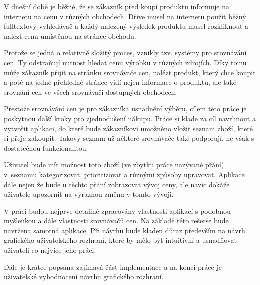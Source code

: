 \begin{introduction}
V dnešní době je běžné, že se zákazník před koupí produktu informuje na internetu na cenu v různých obchodech. Dříve musel na internetu použít běžný fulltextový vyhledávač a každý nalezený výsledek produktu musel rozkliknout a nalézt cenu umístěnou na stránce obchodu.

Protože se jedná o relativně složitý proces, vznikly tzv. systémy pro srovnávání cen. Ty odstraňují nutnost hledat cenu výrobku v různých zdrojích. Díky tomu může zákazník přijít na stránku srovnávače cen, nalézt produkt, který chce koupit a poté na jedné přehledné stránce vidí nejen informace o produktu, ale také srovnání cen ve všech srovnávači dostupných obchodech.

Přestože srovnávání cen je pro zákazníka usnadnění výběru, cílem této práce je poskytnou další kroky pro zjednodušení nákupu. Práce si klade za cíl navrhnout a vytvořit aplikaci, do které bude zákazníkovi umožněno vložit seznam zboží, které si přeje zakoupit. Takový seznam už některé srovnávače také podporují, ne však s dostatečnou funkcionalitou.

Uživatel bude mít možnost toto zboží (ve zbytku práce nazývané přání) v~seznamu kategorizovat, prioritizovat a různými způsoby upravovat. Aplikace dále nejen že bude u těchto přání zobrazovat vývoj ceny, ale navíc dokáže uživatele upozornit na výraznou změnu v tomto vývoji.

V práci budou nejprve detailně zpracovány vlastnosti aplikací s podobnou myšlenkou a dále vlastnosti srovnávačů cen. Na základě této rešerše bude navržena samotná aplikace. Při návrhu bude kladen důraz především na návrh grafického uživatelského rozhraní, které by mělo být intuitivní a usnadňovat uživateli co nejvíce jeho práci.

Dále je krátce popsána zajímavá část implementace a na konci práce je uživatelské vyhodnocení návrhu grafického rozhraní.
\end{introduction}